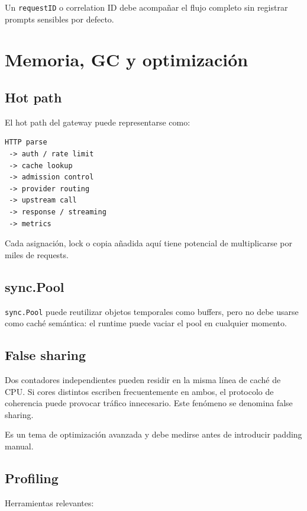 \documentclass[11pt,a4paper]{article}
\newcommand{\code}[1]{\texttt{#1}}
\begin{document}
Un \code{requestID} o correlation ID debe acompañar el flujo completo sin registrar prompts sensibles por defecto.

\section{Memoria, GC y optimización}

\subsection{Hot path}

El hot path del gateway puede representarse como:

\begin{verbatim}
HTTP parse
 -> auth / rate limit
 -> cache lookup
 -> admission control
 -> provider routing
 -> upstream call
 -> response / streaming
 -> metrics
\end{verbatim}

Cada asignación, lock o copia añadida aquí tiene potencial de multiplicarse por miles de requests.

\subsection{sync.Pool}

\code{sync.Pool} puede reutilizar objetos temporales como buffers, pero no debe usarse como caché semántica: el runtime puede vaciar el pool en cualquier momento.

\subsection{False sharing}

Dos contadores independientes pueden residir en la misma línea de caché de CPU. Si cores distintos escriben frecuentemente en ambos, el protocolo de coherencia puede provocar tráfico innecesario. Este fenómeno se denomina false sharing.

Es un tema de optimización avanzada y debe medirse antes de introducir padding manual.

\subsection{Profiling}

Herramientas relevantes:
\end{document}
